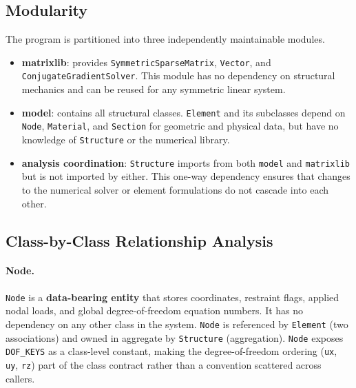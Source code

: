 \subsection*{Modularity}

The program is partitioned into three independently maintainable modules.

\begin{itemize}
  \item \textbf{matrixlib}: provides \texttt{SymmetricSparseMatrix},
  \texttt{Vector}, and \texttt{ConjugateGradientSolver}.
  This module has no dependency on structural mechanics and can be
  reused for any symmetric linear system.

  \item \textbf{model}: contains all structural classes.
  \texttt{Element} and its subclasses depend on \texttt{Node},
  \texttt{Material}, and \texttt{Section} for geometric and physical
  data, but have no knowledge of \texttt{Structure} or the numerical
  library.

  \item \textbf{analysis coordination}: \texttt{Structure} imports from
  both \texttt{model} and \texttt{matrixlib} but is not imported by
  either.
  This one-way dependency ensures that changes to the numerical solver
  or element formulations do not cascade into each other.
\end{itemize}

\subsection*{Class-by-Class Relationship Analysis}

\paragraph{Node.}
\texttt{Node} is a \textbf{data-bearing entity} that stores coordinates,
restraint flags, applied nodal loads, and global degree-of-freedom
equation numbers.
It has no dependency on any other class in the system.
\texttt{Node} is referenced by \texttt{Element} (two associations) and
owned in aggregate by \texttt{Structure} (aggregation).
\texttt{Node} exposes \texttt{DOF\_KEYS} as a class-level constant, making
the degree-of-freedom ordering (\texttt{ux}, \texttt{uy}, \texttt{rz})
part of the class contract rather than a convention scattered across
callers.


